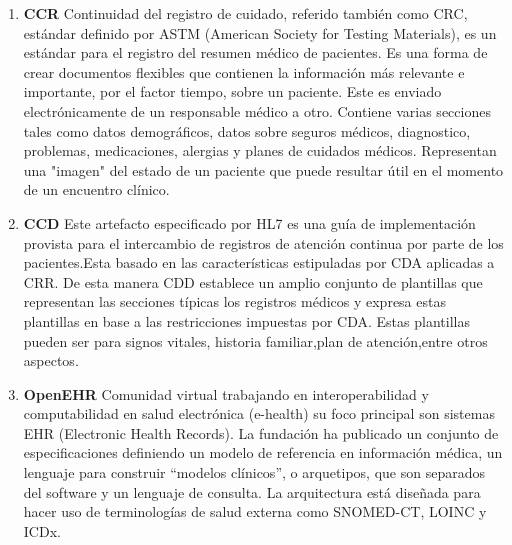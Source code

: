 {\begin{enumerate}
    \item\textbf{CCR} Continuidad del registro de cuidado, referido también como CRC, estándar definido por ASTM (American Society for Testing Materials), es un estándar para el registro del resumen médico de pacientes. Es una forma de crear documentos flexibles que contienen la información más relevante e importante, por el factor tiempo, sobre un paciente. Este es enviado electrónicamente de un responsable médico a otro. Contiene varias secciones tales como datos demográficos, datos sobre seguros médicos, diagnostico, problemas, medicaciones, alergias y planes de cuidados médicos. Representan una "imagen" del estado de un paciente que puede resultar útil en el momento de un encuentro clínico.
    
    
    \item\textbf{CCD}
	Este artefacto especificado por HL7 es una guía de implementación provista para el intercambio de registros de atención continua por parte de los pacientes.Esta basado en las características estipuladas por CDA aplicadas a CRR. De esta manera CDD establece un amplio conjunto de plantillas que representan las secciones típicas los registros médicos y expresa estas plantillas en base a las restricciones impuestas por CDA. Estas plantillas pueden ser para signos vitales, historia familiar,plan de atención,entre otros aspectos. 
    
    \item\textbf{OpenEHR} Comunidad virtual trabajando en interoperabilidad y computabilidad en salud electrónica (e-health) su foco principal son sistemas EHR (Electronic Health Records). La fundación ha publicado un conjunto de especificaciones definiendo un modelo de referencia en información médica, un lenguaje para construir ``modelos clínicos'', o arquetipos, que son separados del software y un lenguaje de consulta. La arquitectura está diseñada para hacer uso de terminologías de salud externa como SNOMED-CT, LOINC y ICDx. 
    
\end{enumerate}
}

